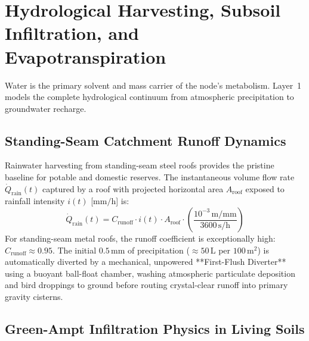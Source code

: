 \section{Hydrological Harvesting, Subsoil Infiltration, and Evapotranspiration}

Water is the primary solvent and mass carrier of the node's metabolism. Layer~1 models the complete hydrological continuum from atmospheric precipitation to groundwater recharge.

\subsection{Standing-Seam Catchment Runoff Dynamics}

Rainwater harvesting from standing-seam steel roofs provides the pristine baseline for potable and domestic reserves. The instantaneous volume flow rate $\dot{Q}_{\mathrm{rain}}(t)$ captured by a roof with projected horizontal area $A_{\mathrm{roof}}$ exposed to rainfall intensity $i(t)$ [$\mathrm{mm/h}$] is:
\begin{equation}
\dot{Q}_{\mathrm{rain}}(t) = C_{\mathrm{runoff}} \cdot i(t) \cdot A_{\mathrm{roof}} \cdot \left( \frac{10^{-3}\,\mathrm{m/mm}}{3600\,\mathrm{s/h}} \right)
\label{eq:runoff_rate}
\end{equation}
For standing-seam metal roofs, the runoff coefficient is exceptionally high: $C_{\mathrm{runoff}} \approx 0.95$. The initial $0.5\,\mathrm{mm}$ of precipitation ($\approx 50\,\mathrm{L}$ per $100\,\mathrm{m}^2$) is automatically diverted by a mechanical, unpowered **First-Flush Diverter** using a buoyant ball-float chamber, washing atmospheric particulate deposition and bird droppings to ground before routing crystal-clear runoff into primary gravity cisterns.

\subsection{Green-Ampt Infiltration Physics in Living Soils}

